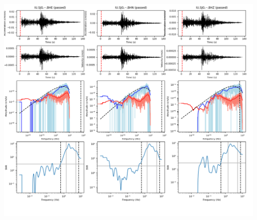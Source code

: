 \documentclass[9pt]{article}
\begin{document}
\includegraphics[height=5.75in]
    {plots/19931003135224_IU.SJG.BH.png}
\end{document}
